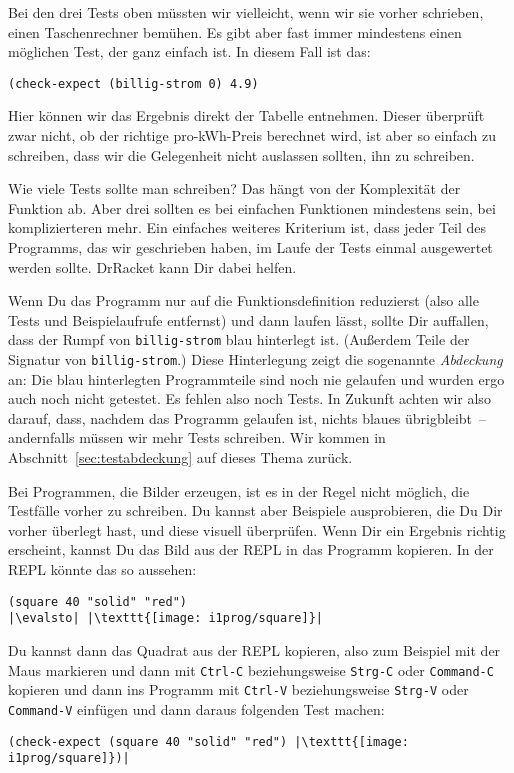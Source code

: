 Bei den drei Tests oben müssten wir vielleicht, wenn wir sie vorher
schrieben, einen Taschenrechner bemühen.  Es gibt aber fast immer
mindestens einen möglichen Test, der ganz einfach ist.  In diesem Fall
ist das:
%
\begin{lstlisting}
(check-expect (billig-strom 0) 4.9)
\end{lstlisting}
%
Hier können wir das Ergebnis direkt der Tabelle entnehmen.  Dieser
überprüft zwar nicht, ob der richtige pro-kWh-Preis berechnet wird,
ist aber so einfach zu schreiben, dass wir die Gelegenheit nicht
auslassen sollten, ihn zu schreiben.

Wie viele Tests sollte man schreiben?  Das hängt von der Komplexität
der Funktion ab.  Aber drei sollten es bei einfachen Funktionen
mindestens sein, bei komplizierteren mehr.  Ein einfaches weiteres
Kriterium ist, dass jeder Teil des Programms, das wir geschrieben
haben, im Laufe der Tests einmal ausgewertet werden sollte.  DrRacket
kann Dir dabei helfen.

\label{page:abdeckung0}
Wenn Du das Programm nur auf die Funktionsdefinition reduzierst (also
alle Tests und Beispiel\-aufrufe entfernst) und dann laufen lässt,
sollte Dir auffallen, dass der Rumpf von \lstinline{billig-strom} blau
hinterlegt ist.  (Außerdem Teile der Signatur von
\lstinline{billig-strom}.)  Diese Hinterlegung zeigt die sogenannte
\textit{Abdeckung} an: Die blau hinterlegten
Programmteile sind noch nie gelaufen und wurden ergo auch noch nicht
getestet.  Es fehlen also noch Tests.  In Zukunft achten wir also
darauf, dass, nachdem das Programm gelaufen ist, nichts blaues
übrigbleibt~-- andernfalls müssen wir mehr Tests schreiben.  Wir
kommen in Abschnitt~\ref{sec:testabdeckung} auf dieses Thema zurück.

Bei Programmen, die Bilder erzeugen, ist es in der Regel nicht
möglich, die Testfälle vorher zu schreiben.  Du kannst aber Beispiele
ausprobieren, die Du Dir vorher überlegt hast, und diese visuell überprüfen.
Wenn Dir ein Ergebnis richtig erscheint, kannst Du das Bild aus der
REPL in das Programm kopieren.  In der REPL könnte das so aussehen:
%
\begin{lstlisting}
(square 40 "solid" "red")
|\evalsto| |\texttt{[image: i1prog/square]}|
\end{lstlisting}
%
Du kannst dann das Quadrat aus der REPL kopieren, also zum Beispiel
mit der Maus markieren und dann mit \texttt{Ctrl-C} beziehungsweise \texttt{Strg-C}
oder \texttt{Command-C} kopieren und dann ins Programm mit
\texttt{Ctrl-V}
beziehungsweise \texttt{Strg-V} oder \texttt{Command-V} einfügen und dann daraus folgenden
Test machen:
%
\begin{lstlisting}
(check-expect (square 40 "solid" "red") |\texttt{[image: i1prog/square]})|
\end{lstlisting}

